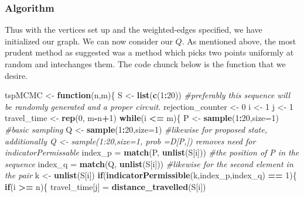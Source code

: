 \documentclass[
]{article}
\newenvironment{Shaded}{\begin{snugshade}}{\end{snugshade}}
\newcommand{\CommentTok}[1]{\textcolor[rgb]{0.56,0.35,0.01}{\textit{#1}}}
\newcommand{\ControlFlowTok}[1]{\textcolor[rgb]{0.13,0.29,0.53}{\textbf{#1}}}
\newcommand{\DataTypeTok}[1]{\textcolor[rgb]{0.13,0.29,0.53}{#1}}
\newcommand{\DecValTok}[1]{\textcolor[rgb]{0.00,0.00,0.81}{#1}}
\newcommand{\KeywordTok}[1]{\textcolor[rgb]{0.13,0.29,0.53}{\textbf{#1}}}
\newcommand{\NormalTok}[1]{#1}
\newcommand{\OperatorTok}[1]{\textcolor[rgb]{0.81,0.36,0.00}{\textbf{#1}}}
\newcommand{\StringTok}[1]{\textcolor[rgb]{0.31,0.60,0.02}{#1}}
\begin{document}
\hypertarget{algorithm}{%
\subsubsection{Algorithm}\label{algorithm}}

Thus with the vertices set up and the weighted-edges specified, we have
initialized our graph. We can now consider our \(Q\). As mentioned
above, the most prudent method as suggested was a method which picks two
points uniformly at random and intechanges them. The code chunck below
is the function that we desire.

\begin{Shaded}
\begin{Highlighting}[]
\NormalTok{tspMCMC <-}\StringTok{ }\ControlFlowTok{function}\NormalTok{(n,m)\{}
\NormalTok{S <-}\StringTok{ }\KeywordTok{list}\NormalTok{(}\KeywordTok{c}\NormalTok{(}\DecValTok{1}\OperatorTok{:}\DecValTok{20}\NormalTok{)) }\CommentTok{#preferably this sequence will be randomly generated and a proper circuit.}
\NormalTok{rejection_counter <-}\StringTok{ }\DecValTok{0}
\NormalTok{i <-}\StringTok{ }\DecValTok{1}
\NormalTok{j <-}\StringTok{ }\DecValTok{1}
\NormalTok{travel_time <-}\StringTok{ }\KeywordTok{rep}\NormalTok{(}\DecValTok{0}\NormalTok{, m}\OperatorTok{-}\NormalTok{n}\OperatorTok{+}\DecValTok{1}\NormalTok{)}
\ControlFlowTok{while}\NormalTok{(i }\OperatorTok{<=}\StringTok{ }\NormalTok{m)\{}
\NormalTok{  P <-}\StringTok{ }\KeywordTok{sample}\NormalTok{(}\DecValTok{1}\OperatorTok{:}\DecValTok{20}\NormalTok{,}\DataTypeTok{size=}\DecValTok{1}\NormalTok{) }\CommentTok{#basic sampling }
\NormalTok{  Q <-}\StringTok{ }\KeywordTok{sample}\NormalTok{(}\DecValTok{1}\OperatorTok{:}\DecValTok{20}\NormalTok{,}\DataTypeTok{size=}\DecValTok{1}\NormalTok{) }\CommentTok{#likewise for proposed state, additionally Q <- sample(1:20,size=1, prob =D[P,]) removes need for indicatorPermissable}
\NormalTok{  index_p =}\StringTok{ }\KeywordTok{match}\NormalTok{(P, }\KeywordTok{unlist}\NormalTok{(S[i])) }\CommentTok{#the position of P in the sequence}
\NormalTok{  index_q =}\StringTok{ }\KeywordTok{match}\NormalTok{(Q, }\KeywordTok{unlist}\NormalTok{(S[i])) }\CommentTok{#likewise for the second element in the pair}
\NormalTok{  k <-}\StringTok{ }\KeywordTok{unlist}\NormalTok{(S[i])}
  \ControlFlowTok{if}\NormalTok{(}\KeywordTok{indicatorPermissible}\NormalTok{(k,index_p,index_q) }\OperatorTok{==}\StringTok{ }\DecValTok{1}\NormalTok{)\{}
    \ControlFlowTok{if}\NormalTok{(i }\OperatorTok{>=}\StringTok{ }\NormalTok{n)\{}
\NormalTok{      travel_time[j] =}\StringTok{ }\KeywordTok{distance_travelled}\NormalTok{(S[i])}

\end{Highlighting}
\end{Shaded}
\end{document}
